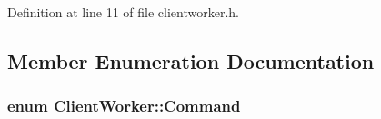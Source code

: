 Definition at line 11 of file clientworker.\+h.



\subsection{Member Enumeration Documentation}
\hypertarget{class_client_worker_a4f4d6c3f13641a69ab19cc5114b58b91}{}
\subsubsection[{Command}]{\setlength{\rightskip}{0pt plus 5cm}enum {\bf Client\+Worker\+::\+Command}\hspace{0.3cm}{\ttfamily [strong]}}\label{class_client_worker_a4f4d6c3f13641a69ab19cc5114b58b91}

